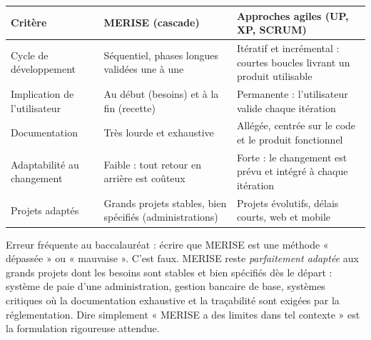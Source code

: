 \documentclass[11pt]{article}
\begin{document}
\begin{center}
\begin{tabularx}{\linewidth}{|l|X|X|}
\hline
\rowcolor{popblueL} \textbf{Critère} & \textbf{MERISE (cascade)} & \textbf{Approches agiles (UP, XP, SCRUM)} \\
\hline
Cycle de développement & Séquentiel, phases longues validées une à une & Itératif et incrémental : courtes boucles livrant un produit utilisable \\
\hline
Implication de l'utilisateur & Au début (besoins) et à la fin (recette) & Permanente : l'utilisateur valide chaque itération \\
\hline
Documentation & Très lourde et exhaustive & Allégée, centrée sur le code et le produit fonctionnel \\
\hline
Adaptabilité au changement & Faible : tout retour en arrière est coûteux & Forte : le changement est prévu et intégré à chaque itération \\
\hline
Projets adaptés & Grands projets stables, bien spécifiés (administrations) & Projets évolutifs, délais courts, web et mobile \\
\hline
\end{tabularx}
\end{center}

\begin{attention}
Erreur fréquente au baccalauréat : écrire que MERISE est une méthode « dépassée » ou « mauvaise ». C'est faux. MERISE reste \emph{parfaitement adaptée} aux grands projets dont les besoins sont stables et bien spécifiés dès le départ : système de paie d'une administration, gestion bancaire de base, systèmes critiques où la documentation exhaustive et la traçabilité sont exigées par la réglementation. Dire simplement « MERISE a des limites dans tel contexte » est la formulation rigoureuse attendue.
\end{attention}
\end{document}
